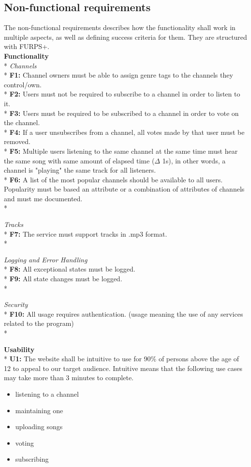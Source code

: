 \documentclass[a4paper,11pt,report]{article}
\begin{document}
\subsection{Non-functional requirements}
The non-functional requirements describes how the functionality shall work in multiple aspects, as well as defining success criteria for them. They are structured with FURPS+. \\

\textbf{Functionality} \\*
\textit{Channels} \\*
\textbf{F1:} Channel owners must be able to assign genre tags to the channels they control/own. \\*
\textbf{F2:} Users must not be required to subscribe to a channel in order to listen to it. \\*
\textbf{F3:} Users must be required to be subscribed to a channel in order to vote on the channel. \\*
\textbf{F4:} If a user unsubscribes from a channel, all votes made by that user must be removed.\\*
\textbf{F5:} Multiple users listening to the same channel at the same time must hear the same song with same amount of elapsed time (\(\Delta\) 1s), in other words, a channel is "playing" the same track for all listeners. \\*
\textbf{F6:} A list of the most popular channels should be available to all users. Popularity must be based an attribute or a combination of attributes of channels and must me documented. \\*

\textit{Tracks} \\*
\textbf{F7:} The service must support tracks in .mp3 format. \\*

\textit{Logging and Error Handling} \\*
\textbf{F8:} All exceptional states must be logged.\\*
\textbf{F9:} All state changes must be logged.\\*

\textit{Security} \\*
\textbf{F10:} All usage requires authentication. (usage meaning the use of any services related to the program)\\*

\textbf{Usability} \\*
\textbf{U1:} The website shall be intuitive to use for 90\% of persons above the age of 12 to appeal to our target audience. Intuitive means that the following use cases may take more than 3 minutes to complete.
\begin{itemize}
\item listening to a channel
\item maintaining one 
\item uploading songs
\item voting
\item subscribing
\end{itemize}
\end{document}
